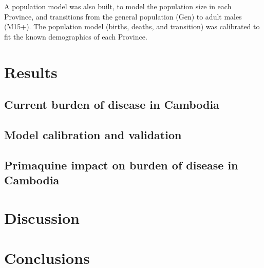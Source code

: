\documentclass[doublespacing]{bmcart}
\begin{document}
A population model was also built, to model the population size in each Province, and transitions from the general population (Gen) to adult males (M15+). The population model (births, deaths, and transition) was calibrated to fit the known demographics of each Province.  


\section*{Results}

\subsection*{Current burden of disease in Cambodia}

\subsection*{Model calibration and validation}

\subsection*{Primaquine impact on burden of disease in Cambodia}

\section*{Discussion}

\section*{Conclusions}

\end{document}
